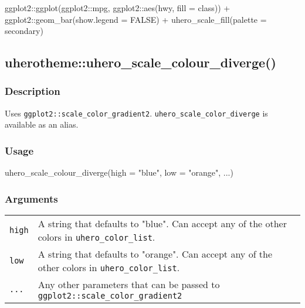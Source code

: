 \documentclass[
  letterpaper,
  DIV=11,
  numbers=noendperiod]{scrreport}
\newenvironment{Shaded}{\begin{snugshade}}{\end{snugshade}}
\newcommand{\AttributeTok}[1]{\textcolor[rgb]{0.40,0.45,0.13}{#1}}
\newcommand{\ConstantTok}[1]{\textcolor[rgb]{0.56,0.35,0.01}{#1}}
\newcommand{\FunctionTok}[1]{\textcolor[rgb]{0.28,0.35,0.67}{#1}}
\newcommand{\NormalTok}[1]{\textcolor[rgb]{0.00,0.23,0.31}{#1}}
\newcommand{\SpecialCharTok}[1]{\textcolor[rgb]{0.37,0.37,0.37}{#1}}
\newcommand{\StringTok}[1]{\textcolor[rgb]{0.13,0.47,0.30}{#1}}
\begin{document}
\begin{Shaded}
\begin{Highlighting}[]
\NormalTok{ggplot2}\SpecialCharTok{::}\FunctionTok{ggplot}\NormalTok{(ggplot2}\SpecialCharTok{::}\NormalTok{mpg, ggplot2}\SpecialCharTok{::}\FunctionTok{aes}\NormalTok{(hwy, }\AttributeTok{fill =}\NormalTok{ class)) }\SpecialCharTok{+}
\NormalTok{ggplot2}\SpecialCharTok{::}\FunctionTok{geom\_bar}\NormalTok{(}\AttributeTok{show.legend =} \ConstantTok{FALSE}\NormalTok{) }\SpecialCharTok{+}
\FunctionTok{uhero\_scale\_fill}\NormalTok{(}\AttributeTok{palette =} \StringTok{\textquotesingle{}secondary\textquotesingle{}}\NormalTok{)}
\end{Highlighting}
\end{Shaded}

\subsection{uherotheme::uhero\_scale\_colour\_diverge()}\label{uherothemeuhero_scale_colour_diverge}

\subsubsection{Description}\label{description-75}

Uses \texttt{ggplot2::scale\_color\_gradient2}.
\texttt{uhero\_scale\_color\_diverge} is available as an alias.

\subsubsection{Usage}\label{usage-75}

\begin{Shaded}
\begin{Highlighting}[]
\FunctionTok{uhero\_scale\_colour\_diverge}\NormalTok{(}\AttributeTok{high =} \StringTok{"blue"}\NormalTok{, }\AttributeTok{low =} \StringTok{"orange"}\NormalTok{, ...)}
\end{Highlighting}
\end{Shaded}

\subsubsection{Arguments}\label{arguments-75}

\begin{longtable}[]{@{}ll@{}}
\toprule\noalign{}
\endhead
\bottomrule\noalign{}
\endlastfoot
\texttt{high} & A string that defaults to "blue". Can accept any of the
other colors in \texttt{uhero\_color\_list}. \\
\texttt{low} & A string that defaults to "orange". Can accept any of the
other colors in \texttt{uhero\_color\_list}. \\
\texttt{...} & Any other parameters that can be passed to
\texttt{ggplot2::scale\_color\_gradient2} \\
\end{longtable}
\end{document}
